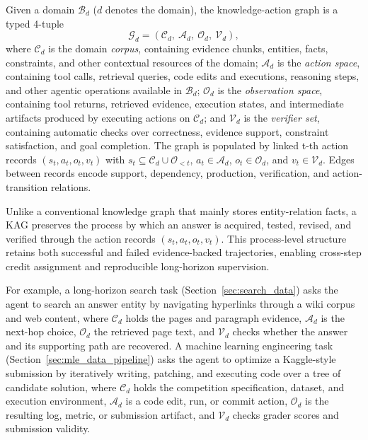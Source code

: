 \documentclass{llmxive}
\begin{document}
\begin{definition}
Given a domain $\mathcal{B}_d$ ($d$ denotes the domain), the knowledge-action graph is a typed 4-tuple
\begin{equation}
\mathcal{G}_d = (\mathcal{C}_d,\ \mathcal{A}_d,\ \mathcal{O}_d,\ \mathcal{V}_d),
\label{eq:kag}
\end{equation}
where $\mathcal{C}_d$ is the domain \emph{corpus}, containing evidence chunks, entities, facts, constraints, and other contextual resources of the domain; $\mathcal{A}_d$ is the \emph{action space}, containing tool calls, retrieval queries, code edits and executions, reasoning steps, and other agentic operations available in $\mathcal{B}_d$; $\mathcal{O}_d$ is the \emph{observation space}, containing tool returns, retrieved evidence, execution states, and intermediate artifacts produced by executing actions on $\mathcal{C}_d$; and $\mathcal{V}_d$ is the \emph{verifier set}, containing automatic checks over correctness, evidence support, constraint satisfaction, and goal completion. The graph is populated by linked t-th action records $(s_t, a_t, o_t, v_t)$ with $s_t \subseteq \mathcal{C}_d \cup \mathcal{O}_{<t}$, $a_t \in \mathcal{A}_d$, $o_t \in \mathcal{O}_d$, and $v_t \in \mathcal{V}_d$. Edges between records encode support, dependency, production, verification, and action-transition relations.
\end{definition}

Unlike a conventional knowledge graph that mainly stores entity-relation facts, a KAG preserves the process by which an answer is acquired, tested, revised, and verified through the action records $(s_t, a_t, o_t, v_t)$. This process-level structure retains both successful and failed evidence-backed trajectories, enabling cross-step credit assignment and reproducible long-horizon supervision. 

For example, a long-horizon search task (Section~\ref{sec:search_data}) asks the agent to search an answer entity by navigating hyperlinks through a wiki corpus and web content, where $\mathcal{C}_d$ holds the pages and paragraph evidence, $\mathcal{A}_d$ is the next-hop choice, $\mathcal{O}_d$ the retrieved page text, and $\mathcal{V}_d$ checks whether the answer and its supporting path are recovered. A machine learning engineering task (Section~\ref{sec:mle_data_pipeline}) asks the agent to optimize a Kaggle-style submission by iteratively writing, patching, and executing code over a tree of candidate solution, where $\mathcal{C}_d$ holds the competition specification, dataset, and execution environment, $\mathcal{A}_d$ is a code edit, run, or commit action, $\mathcal{O}_d$ is the resulting log, metric, or submission artifact, and $\mathcal{V}_d$ checks grader scores and submission validity.
\end{document}
